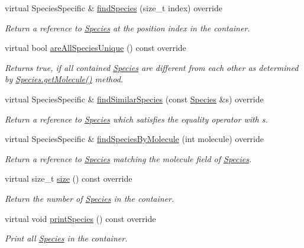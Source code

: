 \begin{DoxyCompactItemize}
virtual Species\+Specific \& \hyperlink{classSpeciesContainerVector_a9551fbf577ee8d7e37fe3ad8d2d52fe9}{find\+Species} (size\+\_\+t index) override
\begin{DoxyCompactList}\small\item\em Return a reference to \hyperlink{classSpecies}{Species} at the position index in the container. \end{DoxyCompactList}\item 
virtual bool \hyperlink{classSpeciesContainerVector_af3750cae18347e9e01173e46256cccfe}{are\+All\+Species\+Unique} () const override
\begin{DoxyCompactList}\small\item\em Returns true, if all contained \hyperlink{classSpecies}{Species} are different from each other as determined by \hyperlink{classSpecies_a1ea8969c51bc69879891a408f9e197c7}{Species.\+get\+Molecule()} method. \end{DoxyCompactList}\item 
virtual Species\+Specific \& \hyperlink{classSpeciesContainerVector_a358f0e8d1c4fc2fcc4646fa957ae3915}{find\+Similar\+Species} (const \hyperlink{classSpecies}{Species} \&s) override
\begin{DoxyCompactList}\small\item\em Return a reference to \hyperlink{classSpecies}{Species} which satisfies the equality operator with s. \end{DoxyCompactList}\item 
virtual Species\+Specific \& \hyperlink{classSpeciesContainerVector_ae6d2d4763abcebf7ffb1b3434b180c6a}{find\+Species\+By\+Molecule} (int molecule) override
\begin{DoxyCompactList}\small\item\em Return a reference to \hyperlink{classSpecies}{Species} matching the molecule field of \hyperlink{classSpecies}{Species}. \end{DoxyCompactList}\item 
virtual size\+\_\+t \hyperlink{classSpeciesContainerVector_ab78398f3bd86ae9b813973181ed705a1}{size} () const override
\begin{DoxyCompactList}\small\item\em Return the number of \hyperlink{classSpecies}{Species} in the container. \end{DoxyCompactList}\item 
virtual void \hyperlink{classSpeciesContainerVector_a31ca6c4ad5a07bad85d8eeb5209ba77b}{print\+Species} () const override
\begin{DoxyCompactList}\small\item\em Print all \hyperlink{classSpecies}{Species} in the container. \end{DoxyCompactList}\item 

\end{DoxyCompactItemize}
